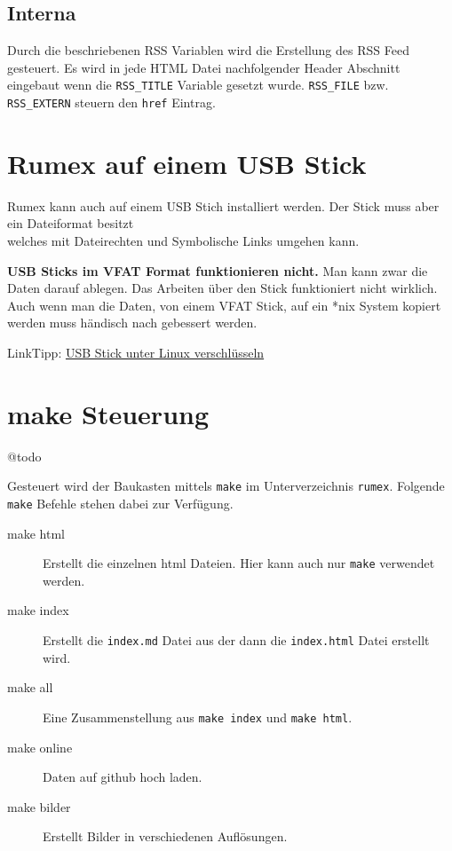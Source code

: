 \documentclass[%
fontsize=12pt,%
parskip=half,%
version=last%
]{scrreprt}
\begin{document}
\subsection{Interna}\label{interna}

Durch die beschriebenen RSS Variablen wird die Erstellung des RSS Feed
gesteuert. Es wird in jede HTML Datei nachfolgender Header Abschnitt
eingebaut wenn die \texttt{RSS\_TITLE} Variable gesetzt wurde.
\texttt{RSS\_FILE} bzw. \texttt{RSS\_EXTERN} steuern den \texttt{href}
Eintrag.


\section{Rumex auf einem USB Stick}\label{rumex-auf-einem-usb-stick}

Rumex kann auch auf einem USB Stich installiert werden. Der Stick muss
aber ein Dateiformat besitzt\\welches mit Dateirechten und Symbolische
Links umgehen kann.

\textbf{USB Sticks im VFAT Format funktionieren nicht.} Man kann zwar
die Daten darauf ablegen. Das Arbeiten über den Stick funktioniert nicht
wirklich. Auch wenn man die Daten, von einem VFAT Stick, auf ein *nix
System kopiert werden muss händisch nach gebessert werden.

LinkTipp:
\href{http://www.it-bayer.de/usb-stick.html?suchwort=versch\#usb-stick-unter-linux-verschl\%C3\%BCsseln}{USB
Stick unter Linux verschlüsseln}

\section{make Steuerung}\label{make-steuerung}

@todo

Gesteuert wird der Baukasten mittels \texttt{make} im Unterverzeichnis
\texttt{rumex}. Folgende \texttt{make} Befehle stehen dabei zur
Verfügung.

\begin{description}
\item[make html]
Erstellt die einzelnen html Dateien. Hier kann auch nur \texttt{make}
verwendet werden.
\item[make index]
Erstellt die \texttt{index.md} Datei aus der dann die
\texttt{index.html} Datei erstellt wird.
\item[make all]
Eine Zusammenstellung aus \texttt{make index} und \texttt{make html}.
\item[make online]
Daten auf github hoch laden.
\item[make bilder]
Erstellt Bilder in verschiedenen Auflösungen.
\end{description}
\end{document}
